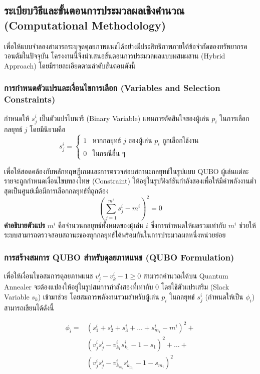 \subsection{ระเบียบวิธีและขั้นตอนการประมวลผลเชิงคำนวณ (Computational Methodology)}
เพื่อให้แบบจำลองสามารถระบุจุดดุลยภาพแนชได้อย่างมีประสิทธิภาพภายใต้ข้อจำกัดของทรัพยากรควอนตัมในปัจจุบัน โครงงานนี้จึงนำเสนอขั้นตอนการประมวลผลแบบผสมผสาน (Hybrid Approach) โดยมีรายละเอียดตามลำดับขั้นตอนดังนี้

\subsubsection{การกำหนดตัวแปรและเงื่อนไขการเลือก (Variables and Selection Constraints)}
กำหนดให้ $s_j^i$ เป็นตัวแปรไบนารี (Binary Variable) แทนการตัดสินใจของผู้เล่น $p_i$ ในการเลือกกลยุทธ์ $j$ โดยมีนิยามคือ
\begin{equation}
s_j^i = \begin{cases} 1 & \text{หากกลยุทธ์ } j \text{ ของผู้เล่น } p_i \text{ ถูกเลือกใช้งาน} \\ 0 & \text{ในกรณีอื่น ๆ} \end{cases}
\end{equation}

เพื่อให้สอดคล้องกับหลักทฤษฎีเกมและการตรวจสอบสถานะกลยุทธ์ในรูปแบบ QUBO ผู้เล่นแต่ละรายจะถูกกำหนดเงื่อนไขบทลงโทษ (Constraint) ให้อยู่ในรูปฟังก์ชันกำลังสองเพื่อให้มีค่าพลังงานต่ำสุดเป็นศูนย์เมื่อมีการเลือกกลยุทธ์ที่ถูกต้อง
\begin{equation}
\left( \sum_{j=1}^{m^i} s_j^i - m^i \right)^2 = 0
\end{equation}
\noindent \textbf{คำอธิบายตัวแปร} $m^i$ คือจำนวนกลยุทธ์ทั้งหมดของผู้เล่น $i$ ซึ่งการกำหนดให้ผลรวมเท่ากับ $m^i$ ช่วยให้ระบบสามารถตรวจสอบสถานะของทุกกลยุทธ์ได้พร้อมกันในการประมวลผลหนึ่งหน่วยย่อย

\subsubsection{การสร้างสมการ QUBO สำหรับดุลยภาพแนช (QUBO Formulation)}
เพื่อให้เงื่อนไขอสมการดุลยภาพแนช $v_j^i - v_k^i - 1 \geq 0$ สามารถคำนวณได้บน Quantum Annealer จะต้องแปลงให้อยู่ในรูปสมการกำลังสองที่เท่ากับ 0 โดยใช้ตัวแปรเสริม (Slack Variable $s_k$) เข้ามาช่วย โดยสมการพลังงานรวมสำหรับผู้เล่น $p_i$ ในกลยุทธ์ $s_j^i$ (กำหนดให้เป็น $\phi_i$) สามารถเขียนได้ดังนี้

\begin{equation}
\begin{aligned}
\phi_i = & \left( s_1^i + s_2^i + s_3^i + \dots + s_{m_i}^i - m^i \right)^2 + \\
& \left( v_j^i s_j^i - v_{k_1}^i s_{k_1}^i - 1 - s_1 \right)^2 + \dots + \\
& \left( v_j^i s_j^i - v_{k_{m_i}}^i s_{k_{m_i}}^i - 1 - s_{m_i} \right)^2
\end{aligned}
\end{equation}

